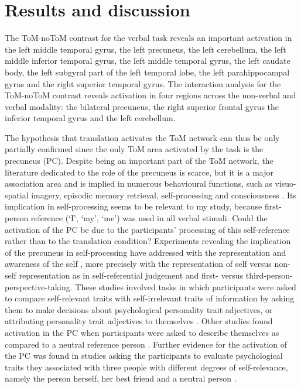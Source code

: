 \documentclass[output=paper]{LSP/langsci}
\begin{document}
\section{Results and discussion}
\largerpage
The ToM-noToM contrast for the verbal task reveals an important activation in the left middle temporal gyrus, the left precuneus, the left cerebellum, the left middle inferior temporal gyrus, the left middle temporal gyrus, the left caudate body, the left subgyral part of the left temporal lobe, the left parahippocampal gyrus and the right superior temporal gyrus. The interaction analysis for the ToM-noToM contrast reveals activation in four regions across the non-verbal and verbal modality: the bilateral precuneus, the right superior frontal gyrus the inferior temporal gyrus and the left cerebellum.

The hypothesis that translation activates the ToM network can thus be only partially confirmed since the only ToM area activated by the task is the precuneus (PC). Despite being an important part of the ToM network, the literature dedicated to the role of the precuneus is scarce, but it is a major association area and is implied in numerous behavioural functions, such as visuo-spatial imagery, episodic memory retrieval, self-processing and consciousness \citep{Cavanna2006}. Its implication in self-processing seems to be relevant to my study, because first-person reference (`I', `my', `me') was used in all verbal stimuli. Could the activation of the PC be due to the participants' processing of this self-reference rather than to the translation condition? Experiments revealing the implication of the precuneus in self-processing have addressed with the representation and awareness of the self \citep{Cavanna2006}, more precisely with the representation of self versus non-self representation as in self-referential judgement and first- versus third-person-perspective-taking. These studies involved tasks in which participants were asked to compare self-relevant traits with self-irrelevant traits of information \citep{Cavanna2006} by asking them to make decisions about psychological personality trait adjectives, or attributing personality trait adjectives to themselves \citep{Cavanna2006}. Other studies found activation in the PC when participants were asked to describe themselves as compared to a neutral reference person \citep{Cavanna2006}. Further evidence for the activation of the PC was found in studies asking the participants to evaluate psychological traits they associated with three people with different degrees of self-relevance, namely the person herself, her best friend and a neutral person \citep{Cavanna2006}.
\end{document}
